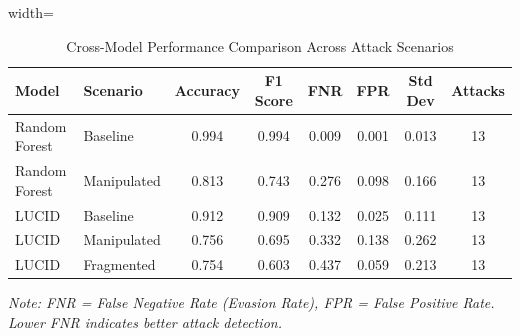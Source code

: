 
\begin{table}[h]
\centering
\caption{Cross-Model Performance Comparison Across Attack Scenarios}
\label{tab:cross_model_comparison}
\begin{adjustbox}{width=\textwidth}
\begin{tabular}{llcccccc}
\hline
\textbf{Model} & \textbf{Scenario} & \textbf{Accuracy} & \textbf{F1 Score} & \textbf{FNR} & \textbf{FPR} & \textbf{Std Dev} & \textbf{Attacks} \\ \hline
Random Forest & Baseline & 0.994 & 0.994 & 0.009 & 0.001 & 0.013 & 13 \\
Random Forest & Manipulated & 0.813 & 0.743 & 0.276 & 0.098 & 0.166 & 13 \\
LUCID & Baseline & 0.912 & 0.909 & 0.132 & 0.025 & 0.111 & 13 \\
LUCID & Manipulated & 0.756 & 0.695 & 0.332 & 0.138 & 0.262 & 13 \\
LUCID & Fragmented & 0.754 & 0.603 & 0.437 & 0.059 & 0.213 & 13 \\
\hline
\end{tabular}
\end{adjustbox}
\vspace{0.1cm}
{\small \textit{Note: FNR = False Negative Rate (Evasion Rate), FPR = False Positive Rate. Lower FNR indicates better attack detection.}}
\end{table}

